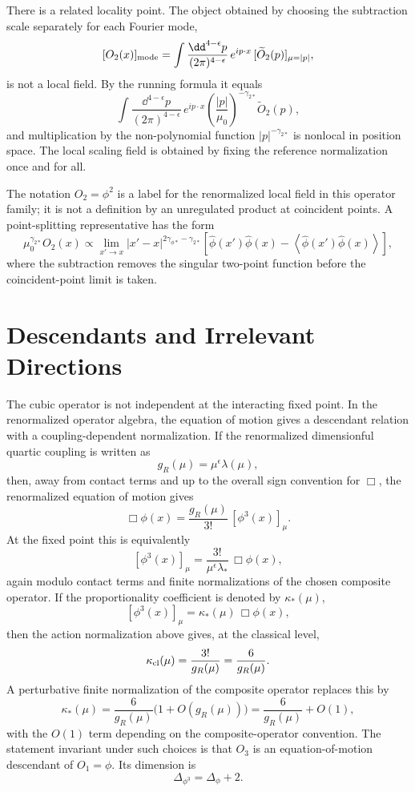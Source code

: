 There is a related locality point.  The object obtained by choosing the
subtraction scale separately for each Fourier mode,
\[
  [O_2(x)]_{\rm mode}
  =
  \int\frac{\dd^{4-\epsilon}p}{(2\pi)^{4-\epsilon}}\,
  e^{ip\cdot x}\,
  [\widetilde O_2(p)]_{\mu=|p|},
\]
is not a local field.  By the running formula it equals
\[
  \int\frac{\dd^{4-\epsilon}p}{(2\pi)^{4-\epsilon}}\,
  e^{ip\cdot x}
  \left(\frac{|p|}{\mu_0}\right)^{-\gamma_{2*}}
  \widetilde O_2(p),
\]
and multiplication by the non-polynomial function
\(|p|^{-\gamma_{2*}}\) is nonlocal in position space.  The local scaling
field is obtained by fixing the reference normalization once and for all.

The notation \(O_2=\phi^2\) is a label for the renormalized local field in this
operator family; it is not a definition by an unregulated product at
coincident points.  A point-splitting representative has the form
\[
  \mu_0^{\gamma_{2*}}O_2(x)
  \propto
  \lim_{x'\to x}
  |x'-x|^{2\gamma_{\phi*}-\gamma_{2*}}
  \left[
    \hat\phi(x')\hat\phi(x)
    -
    \left\langle\hat\phi(x')\hat\phi(x)\right\rangle
  \right],
\]
where the subtraction removes the singular two-point function before the
coincident-point limit is taken.

\section{Descendants and Irrelevant Directions}

The cubic operator is not independent at the interacting fixed point.  In the
renormalized operator algebra, the equation of motion gives a descendant
relation with a coupling-dependent normalization.  If the renormalized
dimensionful quartic coupling is written as
\[
  g_R(\mu)=\mu^\epsilon\lambda(\mu),
\]
then, away from contact terms and up to the overall sign convention for
\(\Box\), the renormalized equation of motion gives
\[
  \Box\phi(x)=\frac{g_R(\mu)}{3!}\,[\phi^3(x)]_\mu .
\]
At the fixed point this is equivalently
\[
  [\phi^3(x)]_\mu
  =
  \frac{3!}{\mu^\epsilon\lambda_*}\,\Box\phi(x),
\]
again modulo contact terms and finite normalizations of the chosen composite
operator.  If the proportionality coefficient is denoted by
\(\kappa_*(\mu)\),
\[
  [\phi^3(x)]_\mu=\kappa_*(\mu)\,\Box\phi(x),
\]
then the action normalization above gives, at the classical level,
\[
  \kappa_{\rm cl}(\mu)
  =
  \frac{3!}{g_R(\mu)}
  =
  \frac{6}{g_R(\mu)}.
\]
A perturbative finite normalization of the composite operator replaces this
by
\[
  \kappa_*(\mu)
  =
  \frac{6}{g_R(\mu)}
  \bigl(1+O(g_R(\mu))\bigr)
  =
  \frac{6}{g_R(\mu)}+O(1),
\]
with the \(O(1)\) term depending on the composite-operator convention.  The
statement invariant under such choices is that \(O_3\) is an
equation-of-motion descendant of \(O_1=\phi\).  Its dimension is
\[
  \Delta_{\phi^3}
  =
  \Delta_\phi+2.
\]

